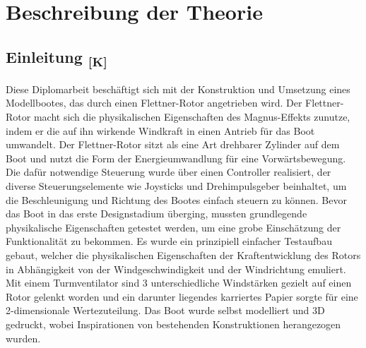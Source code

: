 \documentclass[a4paper,12pt]{article}
\begin{document}
\section{Beschreibung der Theorie}
\label{sec:BeschreibungDerTheorie}

\subsection*{\texorpdfstring{Einleitung \textsubscript{[K]}}{Einleitung [K]}}
\label{sec:Einleitung}

Diese Diplomarbeit beschäftigt sich mit der Konstruktion und Umsetzung eines Modellbootes, das durch einen Flettner-Rotor\cite{wiki_flettner} angetrieben wird. Der Flettner-Rotor macht sich die physikalischen Eigenschaften des Magnus-Effekts\cite{wiki_magnus} zunutze, indem er die auf ihn wirkende Windkraft in einen Antrieb für das Boot umwandelt. Der Flettner-Rotor sitzt als eine Art drehbarer Zylinder auf dem Boot und nutzt die Form der Energieumwandlung für eine Vorwärtsbewegung. Die dafür notwendige Steuerung wurde über einen Controller realisiert, der diverse Steuerungselemente wie Joysticks und Drehimpulsgeber beinhaltet, um die Beschleunigung und Richtung des Bootes einfach steuern zu können. 
Bevor das Boot in das erste Designstadium überging, mussten grundlegende physikalische Eigenschaften getestet werden, um eine grobe Einschätzung der Funktionalität zu bekommen. Es wurde ein prinzipiell einfacher Testaufbau gebaut, welcher die physikalischen Eigenschaften der Kraftentwicklung des Rotors in Abhängigkeit von der Windgeschwindigkeit und der Windrichtung emuliert. Mit einem Turmventilator sind 3 unterschiedliche Windstärken gezielt auf einen Rotor gelenkt worden und ein darunter liegendes karriertes Papier sorgte für eine 2-dimensionale Wertezuteilung. 
Das Boot wurde selbst modelliert und 3D gedruckt, wobei Inspirationen von bestehenden Konstruktionen herangezogen wurden.
\end{document}
